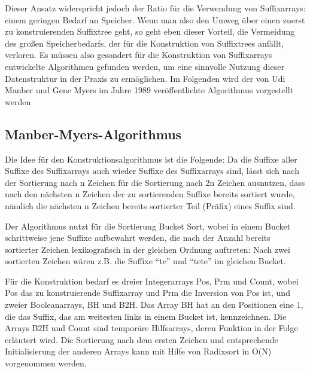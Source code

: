 \documentclass[twoside]{article}
\begin{document}
Dieser Ansatz widerspricht jedoch der Ratio für die Verwendung von Suffixarrays:
einem geringen Bedarf an Speicher.
Wenn man also den Umweg über einen zuerst zu konstruierenden Suffixtree geht, so
geht eben dieser Vorteil, die Vermeidung des großen Speicherbedarfs, der für die
Konstruktion von Suffixtrees anfällt, verloren.
Es müssen also gesondert für die Konstruktion von Suffixarrays entwickelte
Algorithmen gefunden werden, um eine sinnvolle Nutzung dieser Datenstruktur in
der Praxis zu ermöglichen.
Im Folgenden wird der von Udi Manber und Gene Myers im Jahre 1989 veröffentlichte
Algorithmus vorgestellt werden

\subsection{Manber-Myers-Algorithmus}
Die Idee für den Konstruktionsalgorithmus ist die Folgende: Da die Suffixe aller
Suffixe des Suffixarrays auch wieder Suffixe des Suffixarrays sind, lässt sich
nach der Sortierung nach n Zeichen für die Sortierung nach 2n Zeichen ausnutzen,
dass nach den nächsten n Zeichen der zu sortierenden Suffixe bereits sortiert
wurde, nämlich die nächsten n Zeichen bereits sortierter Teil (Präfix) eines Suffix
sind.

Der Algorithmus nutzt für die Sortierung Bucket Sort, wobei in einem Bucket schrittweise
jene Suffixe aufbewahrt werden, die nach der Anzahl bereits sortierter Zeichen
lexikografisch in der gleichen Ordnung auftreten: Nach zwei sortierten Zeichen
wären z.B. die Suffixe "`te"' und "`tete"' im gleichen Bucket.

Für die Konstruktion bedarf es dreier Integerarrays Pos, Prm und Count, wobei Pos das
zu konstruierende Suffixarray und Prm die Inversion von Pos ist, und zweier
Booleanarrays, BH und B2H. Das Array BH hat an den Positionen eine 1, die das Suffix, das
am weitesten links in einem Bucket ist, kennzeichnen. Die Arrays B2H und Count
sind temporäre Hilfsarrays, deren Funktion in der Folge erläutert wird.
Die Sortierung nach dem ersten
Zeichen und entsprechende Initialisierung der anderen Arrays kann mit Hilfe
von Radixsort in O(N) vorgenommen werden. \\
\end{document}
